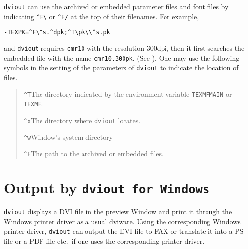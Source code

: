 \documentclass{article}
\begin{document}
{\tt dviout} can use the archived or embedded parameter files 
and font files by indicating \verb|^F\| or \verb|^F/| at the 
top of their filenames.
For example, 
\begin{verbatim}
-TEXPK=^F\^s.^dpk;^T\pk\\^s.pk
\end{verbatim}
 and {\tt dviout}
requires {\tt cmr10} with the resolution 300dpi, then it first 
searches the embedded file with the name {\tt cmr10.300pk}.
(See ).
One may use the following symbols in the setting of the parameters of 
{\tt dviout} to indicate the location of files.
\begin{quote}
\verb|^T|\quad The directory indicated by the environment variable
{\tt TEXMFMAIN} or {\tt TEXMF}.

\verb|^x|\quad The directory where {\tt dviout} locates.

\verb|^w|\quad Window's system directory

%
\verb|^F|\quad The path to the archived or embedded files.
\end{quote}

\section{Output by {\tt dviout for Windows}}
{\tt dviout} displays a DVI file in the preview Window and print it
through the Windows printer driver as a usual dviware.  Using the
corresponding Windows printer driver, {\tt dviout} can output the DVI
file to FAX or translate it into a PS file or a PDF file etc.~if one
uses the corresponding printer driver.
\end{document}
